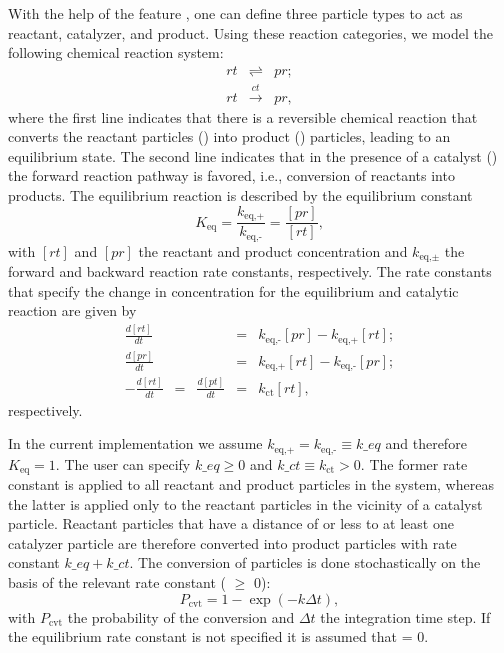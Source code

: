 With the help of the feature , one can define three particle types to act as reactant, catalyzer, and product. Using these reaction categories, we model the following chemical reaction system:
\begin{eqnarray}
rt & \rightleftharpoons & pr ; \\
rt & \xrightarrow{ct} & pr,
\end{eqnarray}
where the first line indicates that there is a reversible chemical reaction that converts the reactant particles () into product () particles, leading to an equilibrium state. The second line indicates that in the presence of a catalyst () the forward reaction pathway is favored, i.e., conversion of reactants into products. The equilibrium reaction is described by the equilibrium constant
\begin{equation}
K_{\text{eq}} = \frac{k_{\text{eq,+}}}{k_{\text{eq,-}}} = \frac{[pr]}{[rt]},
\end{equation}
with $[rt]$ and $[pr]$ the reactant and product concentration and $k_{\text{eq,$\pm$}}$ the forward and backward reaction rate constants, respectively. The rate constants that specify the change in concentration for the equilibrium and catalytic reaction are given by 
\begin{eqnarray}
\frac{d[rt]}{dt} & = & k_{\text{eq,-}}[pr] - k_{\text{eq,+}}[rt] ; \\
\frac{d[pr]}{dt} & = & k_{\text{eq,+}}[rt] - k_{\text{eq,-}}[pr] ; \\
-\frac{d[rt]}{dt} \;\: = \;\: \frac{d[pt]}{dt} & = & k_{\text{ct}}[rt] ,
\end{eqnarray}
respectively.

In the current \es implementation we assume $k_{\text{eq,+}} = k_{\text{eq,-}} \equiv k\_eq$ and therefore $K_{\text{eq}}=1$. The user can specify $k\_eq \ge 0$ and $k\_ct \equiv k_{\text{ct}} > 0$. The former rate constant is applied to all reactant and product particles in the system, whereas the latter is applied only to the reactant particles in the vicinity of a catalyst particle. Reactant particles that have a distance of  or less to at least one catalyzer particle are therefore converted into product particles with rate constant $k\_eq + k\_ct$. The conversion of particles is done stochastically on the basis of the relevant rate constant ( $\ge$ 0):
\begin{equation}
\label{eq:rate} P_{\text{cvt}} = 1 - \exp \left( - k  \Delta t  \right) ,
\end{equation}
with $P_{\text{cvt}}$ the probability of the conversion and $\Delta t$ the integration time step. If the equilibrium rate constant is not specified it is assumed that  = 0.

